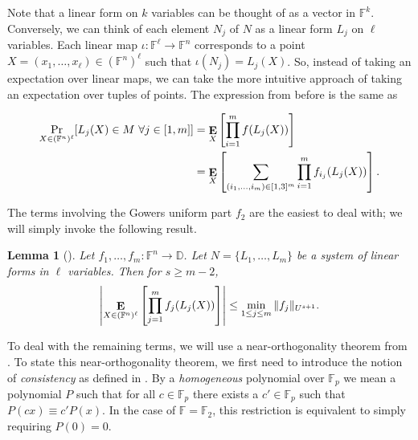 \documentclass{article}
\theoremstyle{plain}
\newtheorem{lemma}[theorem]{Lemma}
\theoremstyle{definition}
\theoremstyle{definition}
\theoremstyle{remark}
\numberwithin{equation}{section}
\newcommand{\DD}{\mathbb{D}}
\newcommand{\FF}{\mathbb{F}}
\newcommand{\F}{\mathbb{F}}
\newcommand{\Esymb}{{\bf E}}
\DeclareMathOperator*{\E}{\Esymb}
\begin{document}
Note that a linear form on $k$ variables can be thought of as a vector in $\FF^k$. Conversely, we can think of each element $N_j$ of $N$ as a linear form $L_j$ on $\ell$ variables. Each linear map $\iota: \FF^{\ell}\to \FF^{n}$ corresponds to a point $X=(x_1,\dots,x_{\ell})\in (\FF^{n})^{\ell}$ such that $\iota(N_j)=L_j(X)$. So, instead of taking an expectation over linear maps, we can take the more intuitive approach of taking an expectation over tuples of points. The expression from before is the same as

\begin{align*}
    \Pr_{X\in (\FF^{n})^{\ell}}[L_j(X)\in M ~ \forall j \in [1,m]]&=\E_{X}\left[\prod_{i=1}^m f(L_j(X))\right]\\
    &=\E_{X}\left[\sum_{(i_1,\dots,i_m)\in [1,3]^m}\prod_{i=1}^m f_{i_j}(L_j(X))\right].
\end{align*}

The terms involving the Gowers uniform part $f_2$ are the easiest to deal with; we will simply invoke the following result.

\begin{lemma}[{\cite[Lemma~3.12]{hatamiRegCount}}]
\label{lem:gowerscount}
Let $f_1,\ldots,f_m:\F^n \to \DD$. Let  $N=\{L_1,\dots,L_m\}$ be a system of linear forms in $\ell$ variables. Then for $s\geq m-2$,
$$
\left| \E_{X\in(\FF^{n})^{\ell}} \left[ \prod_{j=1}^{m} f_j (L_j(X)) \right]\right| \le \min_{1 \le j \le m} \|f_j\|_{U^{s+1}}.
$$
\end{lemma}


To deal with the remaining terms, we will use a near-orthogonality theorem from \cite{hatamiRegCount}. To state this near-orthogonality theorem, we first need to introduce the notion of \emph{consistency} as defined in \cite{hatamiRegCount}. By a \emph{homogeneous} polynomial over $\FF_p$ we mean a polynomial $P$ such that for all $c\in\FF_p$ there exists a $c'\in\FF_p$ such that $P(cx)\equiv c'P(x)$. In the case of $\FF=\FF_2$, this restriction is equivalent to simply requiring $P(0)=0$.
\end{document}
